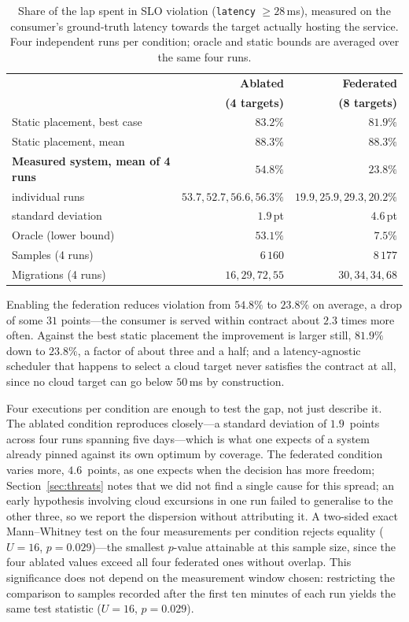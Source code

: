 \documentclass[conference]{IEEEtran}
\begin{document}
\begin{table}[t]
\centering
\caption{Share of the lap spent in SLO violation (\texttt{latency}
$\geq 28$\,ms), measured on the consumer's ground-truth latency towards the
target actually hosting the service. Four independent runs per condition;
oracle and static bounds are averaged over the same four runs.}
\label{tab:violation}
\footnotesize
\setlength{\tabcolsep}{4pt}
\begin{tabular}{@{}lrr@{}}
\toprule
& \textbf{Ablated} & \textbf{Federated}\\
& \textbf{(4 targets)} & \textbf{(8 targets)}\\
\midrule
Static placement, best case   & $83.2\%$ & $81.9\%$\\
Static placement, mean        & $88.3\%$ & $88.3\%$\\
\addlinespace[2pt]
\textbf{Measured system, mean of 4 runs} & $\mathbf{54.8\%}$ & $\mathbf{23.8\%}$\\
\quad individual runs         & $53.7,52.7,56.6,56.3\%$ & $19.9,25.9,29.3,20.2\%$\\
\quad standard deviation      & $1.9$\,pt & $4.6$\,pt\\
\addlinespace[2pt]
Oracle (lower bound)          & $53.1\%$ & $7.5\%$\\
\midrule
Samples (4 runs)              & $6\,160$ & $8\,177$\\
Migrations (4 runs)           & $16,29,72,55$ & $30,34,34,68$\\
\bottomrule
\end{tabular}
\end{table}

Enabling the federation reduces violation from $54.8\%$ to $23.8\%$ on
average, a drop of some $31$ points---the consumer is served within contract
about $2.3$ times more often. Against the best static placement the
improvement is larger still, $81.9\%$ down to $23.8\%$, a factor of about
three and a half; and a latency-agnostic scheduler that happens to select a
cloud target never satisfies the contract at all, since no cloud target can
go below $50$\,ms by construction.

Four executions per condition are enough to test the gap, not just describe
it. The ablated condition reproduces closely---a standard deviation of
$1.9$~points across four runs spanning five days---which is what one expects
of a system already pinned against its own optimum by coverage. The
federated condition varies more, $4.6$~points, as one expects when the
decision has more freedom; Section~\ref{sec:threats} notes that we did not
find a single cause for this spread; an early hypothesis involving cloud
excursions in one run failed to generalise to the other three, so we report
the dispersion without attributing it. A two-sided exact Mann--Whitney test on
the four measurements per condition rejects equality
($U=16$, $p=0.029$)---the smallest $p$-value attainable at this sample size,
since the four ablated values exceed all four federated ones without
overlap. This significance does not depend on the measurement window chosen:
restricting the comparison to samples recorded after the first ten minutes of
each run yields the same test statistic ($U=16$, $p=0.029$).
\end{document}
